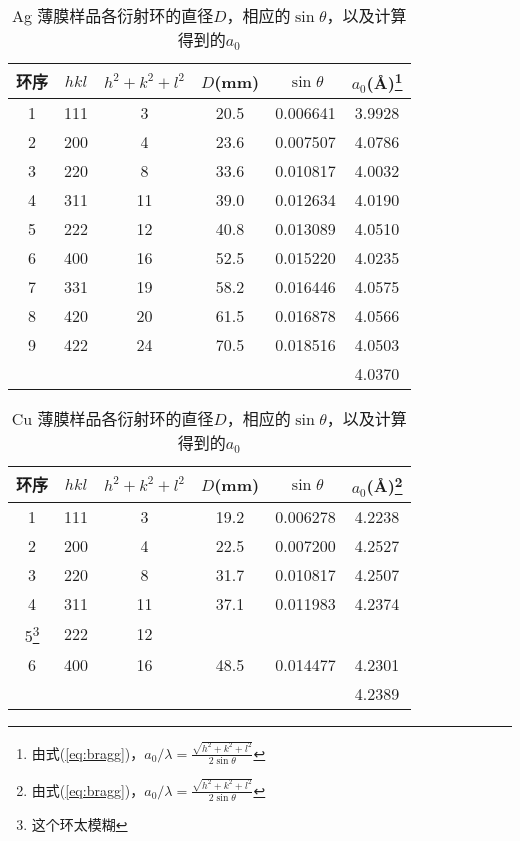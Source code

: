 \documentclass[aps,pre,12pt,preprint,onecolumn,showpacs,showkeys]{revtex4-1}
\begin{document}
    \begin{table}[h]
		\caption{\label{tab:Ag}%
		Ag 薄膜样品各衍射环的直径$D$，相应的$\sin \theta$，以及计算得到的$a_0$}
		\begin{tabular}{|c|c|c|c|c|c|}
			\hline
			环序&$hkl$&$h^2+k^2+l^2$&$D$(mm)&$\sin \theta$&$a_0$(\AA)\footnote{由式(\ref{eq:bragg})，$a_0/\lambda=\frac{\sqrt{h^2+k^2+l^2}}{2 \sin \theta}$}\\\hline
            1 & 111&  3 &  20.5 &  0.006641 &3.9928\\\hline 
            2 & 200&  4 &  23.6 &  0.007507 &4.0786\\\hline
            3 & 220&  8 &  33.6 &  0.010817 &4.0032\\\hline
            4 & 311& 11 &  39.0 &  0.012634 &4.0190\\\hline
            5 & 222& 12 &  40.8 &  0.013089 &4.0510\\\hline
            6 & 400& 16 &  52.5 &  0.015220 &4.0235\\\hline
            7 & 331& 19 &  58.2 &  0.016446 &4.0575\\\hline
            8 & 420& 20 &  61.5 &  0.016878 &4.0566\\\hline
            9 & 422& 24 &  70.5 &  0.018516 &4.0503\\\hline
            &&&&&4.0370\\\hline
        \end{tabular}
    \end{table}

    \begin{table}[h]
		\caption{\label{tab:Cu}%
		Cu 薄膜样品各衍射环的直径$D$，相应的$\sin \theta$，以及计算得到的$a_0$}
		\begin{tabular}{|c|c|c|c|c|c|}
			\hline
			环序&$hkl$&$h^2+k^2+l^2$&$D$(mm)&$\sin \theta$&$a_0$(\AA)\footnote{由式(\ref{eq:bragg})，$a_0/\lambda=\frac{\sqrt{h^2+k^2+l^2}}{2 \sin \theta}$}\\\hline
            1 & 111&  3 &  19.2 &  0.006278 &4.2238\\\hline 
            2 & 200&  4 &  22.5 &  0.007200 &4.2527\\\hline
            3 & 220&  8 &  31.7 &  0.010817 &4.2507\\\hline
            4 & 311& 11 &  37.1 &  0.011983 &4.2374\\\hline
            5\footnote{这个环太模糊} & 222&12  &   &   &\\\hline
            6 & 400& 16 &  48.5 &  0.014477 &4.2301\\\hline
            &&&&&4.2389\\\hline
        \end{tabular}
    \end{table}
    
\end{document}
